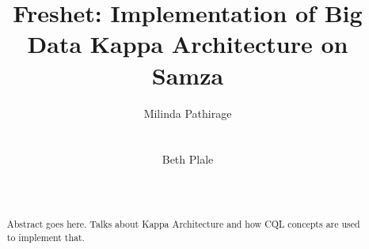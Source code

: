 \documentclass{sig-alternate}
\begin{document}
%

\title{Freshet: Implementation of Big Data Kappa Architecture on Samza}


\author{
\alignauthor
Milinda Pathirage\\
       \\
       \\
\alignauthor
Beth Plale\\
       \\
       \\
}

\maketitle
\begin{abstract}
  Abstract goes here. Talks about Kappa Architecture and how CQL concepts are used to implement that.
\end{abstract}
\end{document}
